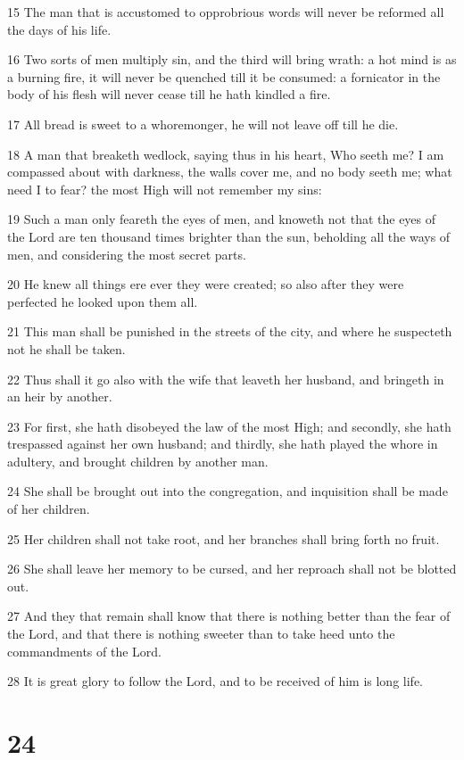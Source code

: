 \par 15 The man that is accustomed to opprobrious words will never be reformed all the days of his life.
\par 16 Two sorts of men multiply sin, and the third will bring wrath: a hot mind is as a burning fire, it will never be quenched till it be consumed: a fornicator in the body of his flesh will never cease till he hath kindled a fire.
\par 17 All bread is sweet to a whoremonger, he will not leave off till he die.
\par 18 A man that breaketh wedlock, saying thus in his heart, Who seeth me? I am compassed about with darkness, the walls cover me, and no body seeth me; what need I to fear? the most High will not remember my sins:
\par 19 Such a man only feareth the eyes of men, and knoweth not that the eyes of the Lord are ten thousand times brighter than the sun, beholding all the ways of men, and considering the most secret parts.
\par 20 He knew all things ere ever they were created; so also after they were perfected he looked upon them all.
\par 21 This man shall be punished in the streets of the city, and where he suspecteth not he shall be taken.
\par 22 Thus shall it go also with the wife that leaveth her husband, and bringeth in an heir by another.
\par 23 For first, she hath disobeyed the law of the most High; and secondly, she hath trespassed against her own husband; and thirdly, she hath played the whore in adultery, and brought children by another man.
\par 24 She shall be brought out into the congregation, and inquisition shall be made of her children.
\par 25 Her children shall not take root, and her branches shall bring forth no fruit.
\par 26 She shall leave her memory to be cursed, and her reproach shall not be blotted out.
\par 27 And they that remain shall know that there is nothing better than the fear of the Lord, and that there is nothing sweeter than to take heed unto the commandments of the Lord.
\par 28 It is great glory to follow the Lord, and to be received of him is long life.

\chapter{24}

